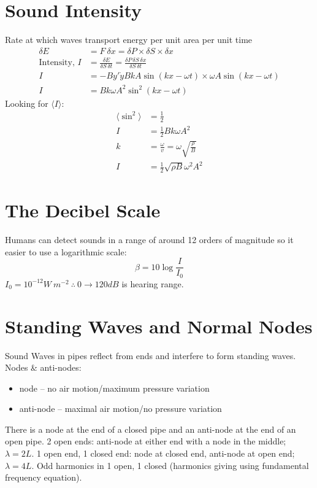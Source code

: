 \documentclass[a4paper, 11pt, normalem]{report}
\begin{document}
\section{Sound Intensity}
Rate at which waves transport energy per unit area per unit time
\begin{align}
    \delta E &= F\:\delta x = \delta P\times \delta S\times \delta x \\
    \text{Intensity, } I &= \frac{\delta E}{\delta S\,\delta t} = \frac{\delta P\,\delta S\,\delta x}{\delta S\,\delta t} \\
    I &= -By'\dot{y} BkA\sin{(kx - \omega t)}\times\omega A\sin{(kx - \omega t)} \\
    I &= Bk\omega A^{2}\sin^{2}{(kx - \omega t)}
\end{align}
Looking for $\langle I\rangle$:
\begin{align}
    \langle\sin^{2}\rangle &= \frac{1}{2} \\
    I &= \frac{1}{2}Bk\omega A^{2} \\
    k &= \frac{\omega}{v} = \omega\sqrt{\frac{\rho}{B}} \\
    I &= \frac{1}{2}\sqrt{\rho B}\omega^{2}A^{2}
\end{align}

\section{The Decibel Scale}
Humans can detect sounds in a range of around 12 orders of magnitude so it easier to use a logarithmic scale:
\begin{equation}
    \beta = 10\log{\frac{I}{I_{0}}}
\end{equation}
$I_{0} = 10^{-12} W\:m^{-2} ~\therefore~ 0 \rightarrow 120dB$ is hearing range.

\section{Standing Waves and Normal Nodes}
Sound Waves in pipes reflect from ends and interfere to form standing waves.
Nodes \& anti-nodes:
\begin{itemize} 
    \item node -- no air motion/maximum pressure variation
    \item anti-node -- maximal air motion/no pressure variation 
\end{itemize}
There is a node at the end of a closed pipe and an anti-node at the end of an open pipe.
2 open ends: anti-node at either end with a node in the middle; $\lambda = 2L$.
1 open end, 1 closed end: node at closed end, anti-node at open end; $\lambda = 4L$.
Odd harmonics in 1 open, 1 closed (harmonics giving using fundamental frequency equation).
\end{document}

